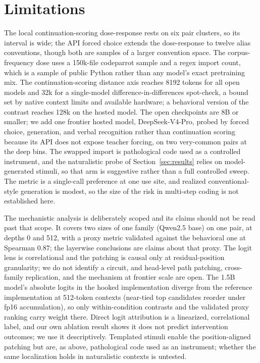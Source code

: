 \documentclass[11pt]{article}
\begin{document}
\section*{Limitations}

The local continuation-scoring dose-response rests on six pair clusters, so its interval is wide; the API forced choice extends the dose-response to twelve alias conventions, though both are samples of a larger convention space. The corpus-frequency dose uses a 150k-file codeparrot sample and a regex import count, which is a sample of public Python rather than any model's exact pretraining mix. The continuation-scoring distance axis reaches 8192 tokens for all open models and 32k for a single-model difference-in-differences spot-check, a bound set by native context limits and available hardware; a behavioral version of the contrast reaches 128k on the hosted model. The open checkpoints are 8B or smaller; we add one frontier hosted model, DeepSeek-V4-Pro, probed by forced choice, generation, and verbal recognition rather than continuation scoring because its API does not expose teacher forcing, on two very-common pairs at the deep bins. The swapped import is pathological code used as a controlled instrument, and the naturalistic probe of Section~\ref{sec:results} relies on model-generated stimuli, so that arm is suggestive rather than a full controlled sweep. The metric is a single-call preference at one use site, and realized conventional-style generation is modest, so the size of the risk in multi-step coding is not established here.

The mechanistic analysis is deliberately scoped and its claims should not be read past that scope. It covers two sizes of one family (Qwen2.5 base) on one pair, at depths 0 and 512, with a proxy metric validated against the behavioral one at Spearman $0.87$; the layerwise conclusions are claims about that proxy. The logit lens is correlational and the patching is causal only at residual-position granularity; we do not identify a circuit, and head-level path patching, cross-family replication, and the mechanism at frontier scale are open. The 1.5B model's absolute logits in the hooked implementation diverge from the reference implementation at 512-token contexts (near-tied top candidates reorder under fp16 accumulation), so only within-condition contrasts and the validated proxy ranking carry weight there. Direct logit attribution is a linearized, correlational label, and our own ablation result shows it does not predict intervention outcomes; we use it descriptively. Templated stimuli enable the position-aligned patching but are, as above, pathological code used as an instrument; whether the same localization holds in naturalistic contexts is untested.
\end{document}
